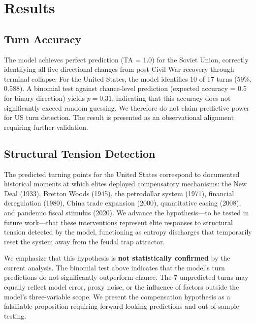 \section{Results}
\label{sec:results}

\subsection{Turn Accuracy}



The model achieves perfect prediction (TA = 1.0) for the Soviet Union, correctly identifying all five directional changes from post-Civil War recovery through terminal collapse. For the United States, the model identifies 10 of 17 turns (59\%, 0.588). A binomial test against chance-level prediction (expected accuracy = 0.5 for binary direction) yields $p = 0.31$, indicating that this accuracy does not significantly exceed random guessing. We therefore do not claim predictive power for US turn detection. The result is presented as an observational alignment requiring further validation.

\subsection{Structural Tension Detection}



The predicted turning points for the United States correspond to documented historical moments at which elites deployed compensatory mechanisms: the New Deal (1933), Bretton Woods (1945), the petrodollar system (1971), financial deregulation (1980), China trade expansion (2000), quantitative easing (2008), and pandemic fiscal stimulus (2020). We advance the hypothesis---to be tested in future work---that these interventions represent elite responses to structural tension detected by the model, functioning as entropy discharges that temporarily reset the system away from the feudal trap attractor.

We emphasize that this hypothesis is \textbf{not statistically confirmed} by the current analysis. The binomial test above indicates that the model's turn predictions do not significantly outperform chance. The 7 unpredicted turns may equally reflect model error, proxy noise, or the influence of factors outside the model's three-variable scope. We present the compensation hypothesis as a falsifiable proposition requiring forward-looking predictions and out-of-sample testing.

